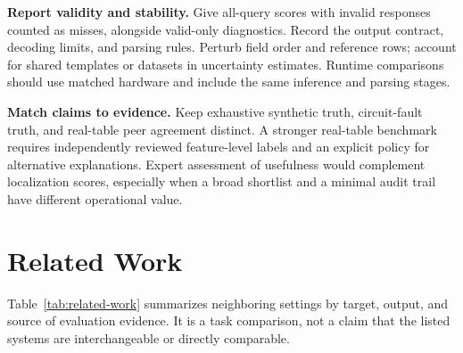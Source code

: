 \documentclass[conference]{IEEEtran}
\begin{document}
\textbf{Report validity and stability.} Give all-query scores with invalid responses counted as misses, alongside valid-only diagnostics. Record the output contract, decoding limits, and parsing rules. Perturb field order and reference rows; account for shared templates or datasets in uncertainty estimates. Runtime comparisons should use matched hardware and include the same inference and parsing stages.

\textbf{Match claims to evidence.} Keep exhaustive synthetic truth, circuit-fault truth, and real-table peer agreement distinct. A stronger real-table benchmark requires independently reviewed feature-level labels and an explicit policy for alternative explanations. Expert assessment of usefulness would complement localization scores, especially when a broad shortlist and a minimal audit trail have different operational value.

\section{Related Work}
Table~\ref{tab:related-work} summarizes neighboring settings by target, output, and source of evaluation evidence. It is a task comparison, not a claim that the listed systems are interchangeable or directly comparable.
\end{document}
